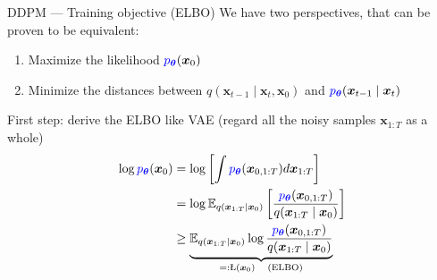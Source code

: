 \documentclass[10pt]{beamer}
\begin{document}
\begin{frame}{DDPM --- \normalsize Training objective (ELBO)}
    We have two perspectives, that can be proven to be equivalent:
    \begin{enumerate}
        \item Maximize the likelihood $\textcolor{blue}{p_{\bm{\theta}}}(\bm{x}_0)$
        \item Minimize the distances between $q(\bm{x}_{t-1}\mid\bm{x}_t,\bm{x}_0)$ and $\textcolor{blue}{p_{\bm{\theta}}}(\bm{x}_{t-1}\mid\bm{x}_{t})$
    \end{enumerate}
    \bigskip
    First step: derive the ELBO like VAE (regard all the noisy samples $\bm{x}_{1:T}$ as a whole)
    \begin{align*}
        \log\textcolor{blue}{p_{\bm{\theta}}}(\bm{x}_0)
        & = \log\left[
            \int\textcolor{blue}{p_{\bm{\theta}}}(\bm{x}_{0,1:T})d\bm{x}_{1:T}
        \right] \\
        & = \log \mathbb{E}_{q(\bm{x}_{1:T}\mid \bm{x}_0)}\left[
            \frac{\textcolor{blue}{p_{\bm{\theta}}}(\bm{x}_{0,1:T})}{q(\bm{x}_{1:T}\mid \bm{x}_0)}
        \right] \\
        & \geq \underbrace{\mathbb{E}_{q(\bm{x}_{1:T}\mid \bm{x}_0)} \log \frac{\textcolor{blue}{p_{\bm{\theta}}}(\bm{x}_{0,1:T})}{q(\bm{x}_{1:T}\mid \bm{x}_0)}}_{=:\text{\L}(\bm{x}_0)\quad(\text{ELBO})}
    \end{align*}
\end{frame}
\end{document}
